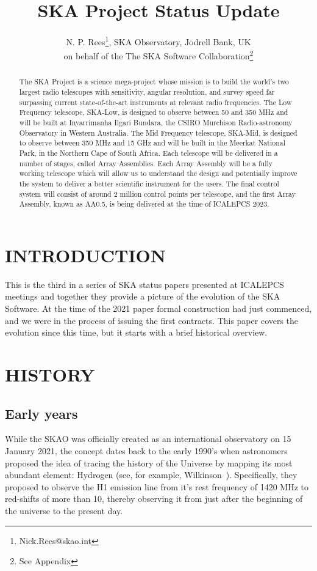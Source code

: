 \documentclass[a4paper,
               biblatex,     %
               keeplastbox,   %
               ]{jacow}
\begin{document}
\title{SKA Project Status Update}

\author{N. P. Rees\thanks{Nick.Rees@skao.int}, SKA Observatory, Jodrell Bank, UK\\
		on behalf of the The SKA Software Collaboration\thanks{See Appendix}}


\maketitle

%
\begin{abstract}
The SKA Project is a science mega-project whose mission is to build the world's two largest radio telescopes with sensitivity, angular resolution, and survey speed far surpassing current state-of-the-art instruments at relevant radio frequencies. The Low Frequency telescope, SKA-Low, is designed to observe between 50 and 350 MHz and will be built at Inyarrimanha Ilgari Bundara, the CSIRO Murchison Radio-astronomy Observatory in Western Australia. The Mid Frequency telescope, SKA-Mid, is designed to observe between 350 MHz and 15 GHz and will be built in the Meerkat National Park, in the Northern Cape of South Africa. Each telescope will be delivered in a number of stages, called Array Assemblies. Each Array Assembly will be a fully working telescope which will allow us to understand the design and potentially improve the system to deliver a better scientific instrument for the users. The final control system will consist of around 2 million control points per telescope, and the first Array Assembly, known as AA0.5, is being delivered at the time of ICALEPCS 2023.
\end{abstract}

\section{INTRODUCTION}
This is the third in a series of SKA status papers presented at ICALEPCS meetings and together they provide a picture of the evolution of the SKA Software. At the time of the 2021 paper formal construction had just commenced, and we were in the process of issuing the first contracts. This paper covers the evolution since this time, but it starts with a brief historical overview.

\section{HISTORY}
\subsection{Early years}
While the SKAO was officially created as an international observatory on 15 January 2021, the concept dates back to the early 1990's when astronomers proposed the idea of tracing the history of the Universe by mapping its most abundant element: Hydrogen (see, for example, Wilkinson~\cite{1991ASPC...19..428W}). Specifically, they proposed to observe the H1 emission line from it's rest frequency of 1420 MHz to red-shifts of more than 10, thereby observing it from just after the beginning of the universe to the present day.
\end{document}
